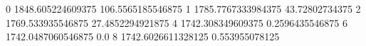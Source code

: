 0 1848.605224609375 106.5565185546875
1 1785.7767333984375 43.72802734375
2 1769.533935546875 27.4852294921875
4 1742.308349609375 0.2596435546875
6 1742.0487060546875 0.0
8 1742.6026611328125 0.553955078125
